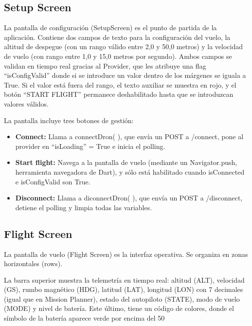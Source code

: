 \subsection{Setup Screen}
La pantalla de configuración (SetupScreen) es el punto de partida de la aplicación. Contiene dos campos de texto para la configuración del vuelo, la altitud de despegue (con un rango válido entre 2,0 y 50,0 metros) y la velocidad de vuelo (con rango entre 1,0 y 15,0 metros por segundo). Ambos campos se validan en tiempo real gracias al Provider, que les atribuye una flag “isConfigValid” donde si se introduce un valor dentro de los márgenes se iguala a True. Si el valor está fuera del rango, el texto auxiliar se muestra en rojo, y el botón “START FLIGHT” permanece deshabilitado hasta que se introduzcan valores válidos.

La pantalla incluye tres botones de gestión: 
\begin{itemize}
  \item \textbf{Connect:} Llama a connectDron( ), que envía un POST a /connect, pone al provider en “isLoading” = True e inicia el polling.
  
\item \textbf{Start flight:} Navega a la pantalla de vuelo (mediante un Navigator.push, herramienta navegadora de Dart), y sólo está habilitado cuando isConnected e isConfigValid son True.

\item \textbf{Disconnect:}  Llama a diconnectDron( ), que envía un POST a /disconnect, detiene el polling y limpia todas las variables.
\end{itemize}

\subsection{Flight Screen}
La pantalla de vuelo (Flight Screen) es la interfaz operativa. Se organiza en zonas horizontales (rows).

La barra superior muestra la telemetría en tiempo real: altitud (ALT), velocidad (GS), rumbo magnético (HDG), latitud (LAT), longitud (LON) con 7 decimales (igual que en Mission Planner), estado del autopiloto (STATE), modo de vuelo (MODE) y nivel de batería. Este último, tiene un código de colores, donde el símbolo de la batería aparece verde por encima del 50%

